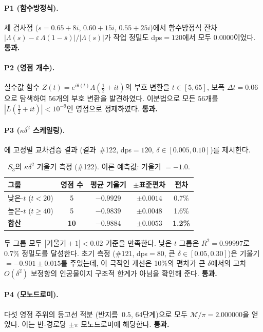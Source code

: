\documentclass[11pt, a4paper]{article}
\theoremstyle{plain}
\theoremstyle{definition}
\newcommand{\abs}[1]{\left|#1\right|}
\newcommand{\Lam}{\Lambda}             %
\newcommand{\kap}{\kappa}             %
\newcommand{\mono}{\mathcal{M}}       %
\begin{document}
\paragraph{P1 (함수방정식).}
세 검사점 ($s = 0.65+8i$, $0.60+15i$, $0.55+25i$)에서 함수방정식 잔차
$\abs{\Lam(s) - \varepsilon\,\Lam(1-\bar{s})}/\abs{\Lam(s)}$가
작업 정밀도 dps${}=120$에서 모두 $0.0000$이었다.
\textbf{통과.}

\paragraph{P2 (영점 개수).}
실수값 함수 $Z(t) = e^{i\theta(t)}\Lam(\tfrac{1}{2}+it)$의
부호 변환을 $t \in [5, 65]$, 보폭 $\Delta t = 0.06$으로 탐색하여
56개의 부호 변환을 발견하였다. 이분법으로 모든 56개를
$\abs{L(\tfrac{1}{2}+it)} < 10^{-9}$인 영점으로 정제하였다.
\textbf{통과.}

\paragraph{P3 ($\kap\delta^{2}$ 스케일링).}
에 고정밀 교차검증 결과 (결과~\#122, dps${}=120$,
$\delta \in [0.005, 0.10]$)를 제시한다.

\begin{table}[ht]
\centering
\caption{$S_{3}$의 $\kap\delta^{2}$ 기울기 측정 (\#122).
  이론 예측값: 기울기 $= -1.0$.}
\label{tab:s3-kappa}
\begin{tabular}{@{}lcccc@{}}
\toprule
\textbf{그룹} & \textbf{영점 수} & \textbf{평균 기울기} & $\pm$\textbf{표준편차} & \textbf{편차} \\
\midrule
낮은-$t$ ($t < 20$) & 5 & $-0.9929$ & $\pm0.0014$ & 0.7\% \\
높은-$t$ ($t \ge 40$) & 5 & $-0.9839$ & $\pm0.0048$ & 1.6\% \\
\midrule
\textbf{합산} & \textbf{10} & $\bm{-0.9884}$ & $\pm\bm{0.0053}$ & \textbf{1.2\%} \\
\bottomrule
\end{tabular}
\end{table}

두 그룹 모두 $\abs{\text{기울기}+1} < 0.02$ 기준을 만족한다.
낮은-$t$ 그룹은 $R^{2} = 0.99997$로 0.7\% 정밀도를 달성한다.
초기 측정 (\#121, dps${}=80$, 큰 $\delta \in [0.05,0.30]$)은
기울기 $= -0.901 \pm 0.015$를 주었는데, 이 극적인 개선은
10\%의 편차가 큰 $\delta$에서의 고차 $O(\delta^{2})$ 보정항의
인공물이지 구조적 한계가 아님을 확인해 준다.
\textbf{통과.}

\paragraph{P4 (모노드로미).}
다섯 영점 주위의 등고선 적분 (반지름~$0.5$, 64단계)으로
모두 $\mono/\pi = 2.000000$을 얻었다. 이는 반-경로당 $\pm\pi$ 모노드로미에 해당한다.
\textbf{통과.}
\end{document}
